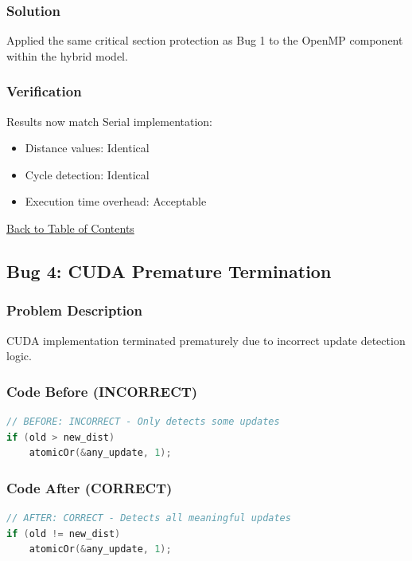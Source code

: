 \documentclass[12pt,a4paper]{article}
\begin{document}
\subsubsection*{Solution}

Applied the same critical section protection as Bug 1 to the OpenMP component within the hybrid model.

\subsubsection*{Verification}

Results now match Serial implementation:
\begin{itemize}
    \item Distance values: Identical
    \item Cycle detection: Identical
    \item Execution time overhead: Acceptable
\end{itemize}

\hyperref[contents]{\small Back to Table of Contents}

\subsection{Bug 4: CUDA Premature Termination}

\subsubsection*{Problem Description}

CUDA implementation terminated prematurely due to incorrect update detection logic.

\subsubsection*{Code Before (INCORRECT)}

\begin{lstlisting}[language=C, caption=CUDA with incorrect termination logic]
// BEFORE: INCORRECT - Only detects some updates
if (old > new_dist)
    atomicOr(&any_update, 1);
\end{lstlisting}

\subsubsection*{Code After (CORRECT)}

\begin{lstlisting}[language=C, caption=CUDA with correct termination logic]
// AFTER: CORRECT - Detects all meaningful updates
if (old != new_dist)
    atomicOr(&any_update, 1);
\end{lstlisting}
\end{document}
